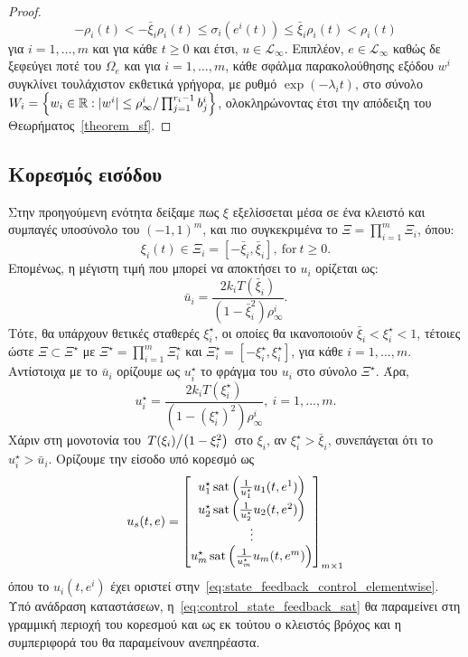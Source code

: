 \begin{proof}
\[
- \rho_i(t) < - \bar \xi_i \rho_i(t) \leq \sigma_i(e^i(t)) \leq \bar \xi_i \rho_i(t) < \rho_i(t)
\]
για $i = 1,\ldots, m$ και για κάθε $t \geq 0$ και έτσι, $u \in \mathcal L_\infty$. Επιπλέον,   $e \in \mathcal L_\infty$ καθώς δε ξεφεύγει ποτέ του $\Omega_e$ και για $i =1,\ldots, m$, κάθε σφάλμα παρακολούθησης εξόδου $w^i$ συγκλίνει τουλάχιστον εκθετικά γρήγορα, με ρυθμό $\exp(-\lambda_i t)$, στο σύνολο $W_i = \qty{w_i \in \mathbb{R}: |w^i| \leq \rho^i_\infty/\prod_{j=1}^{r_i - 1} b_j^i}$, ολοκληρώνοντας έτσι την απόδειξη του Θεωρήματος~\ref{theorem_sf}.
\end{proof}

\subsection{Κορεσμός εισόδου}
\label{section:input_saturation}
Στην προηγούμενη ενότητα δείξαμε πως $\xi$  εξελίσσεται μέσα σε ένα κλειστό και συμπαγές υποσύνολο του $(-1, 1)^{m}$, και πιο συγκεκριμένα το $\Xi = \prod_{i=1}^m \Xi_i$, όπου:
\[
    \xi_i(t) \in \Xi_i = 
    [- \bar \xi_i, \bar \xi_i],\ 
    \text{for}\ t \geq 0.
\]
Επομένως, η μέγιστη τιμή που μπορεί να αποκτήσει το $u_i$ ορίζεται ως:
\[
    \bar u_i = \frac{2 k_i T(\bar \xi_i)}
    {(1- \bar \xi_i^2) \rho_\infty^i}.
\]
Τότε, θα υπάρχουν θετικές σταθερές $\xi_i^\star$, οι οποίες θα ικανοποιούν $\bar \xi_i < \xi_i^\star < 1$, τέτοιες ώστε $\Xi \subset \Xi^\star$ με $\Xi^\star = \prod_{i=1}^m \Xi_i^\star$ και $\Xi_i^\star = [-\xi_i^\star, \xi_i^\star]$, για κάθε $i = 1, \ldots, m$. Αντίστοιχα με το $\bar u_i$ ορίζουμε ως $u_i^\star$ το φράγμα του $u_i$ στο σύνολο $\Xi^\star$. Άρα,
\[
    u_i^\star = \frac{2 k_i T(\xi_i^\star)}
    {(1- (\xi_i^\star)^2) \rho_\infty^i},\ i=1, \ldots, m.
\]
Χάριν στη μονοτονία του $\flatfrac{T(\xi_i)}{\pqty{1 - \xi_i^2}}$ στο $\xi_i$, αν $\xi_i^\star > \bar \xi_i$, συνεπάγεται ότι το $u_i^\star > \bar u_i$. Ορίζουμε την είσοδο υπό κορεσμό ως 
\begin{equation}
\label{eq:control_state_feedback_sat}
    u_s(t, e) = \begin{bmatrix}
        u_1^\star \operatorname{sat}\left(\frac{1}{u_1^\star} u_1(t, e^1) \right)\\
        u_2^\star \operatorname{sat}\left(\frac{1}{u_2^\star} u_2(t, e^2) \right)\\
        \vdots\\
        u_m^\star \operatorname{sat}\left(\frac{1}{u_m^\star} u_m(t, e^m) \right)\\
    \end{bmatrix}_{m \times 1}
\end{equation}
όπου το $u_i(t, e^i)$ έχει οριστεί στην~\eqref{eq:state_feedback_control_elementwise}. Υπό ανάδραση καταστάσεων, η~\eqref{eq:control_state_feedback_sat} θα παραμείνει στη γραμμική περιοχή του κορεσμού και ως εκ τούτου ο κλειστός βρόχος και η συμπεριφορά του θα παραμείνουν ανεπηρέαστα.

